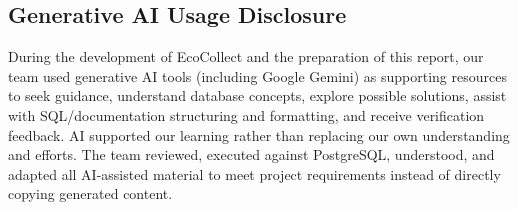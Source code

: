 \subsection{Generative AI Usage Disclosure}
During the development of EcoCollect and the preparation of this report, our team used generative AI tools (including Google Gemini) as supporting resources to seek guidance, understand database concepts, explore possible solutions, assist with SQL/documentation structuring and formatting, and receive verification feedback. AI supported our learning rather than replacing our own understanding and efforts. The team reviewed, executed against PostgreSQL, understood, and adapted all AI-assisted material to meet project requirements instead of directly copying generated content.
